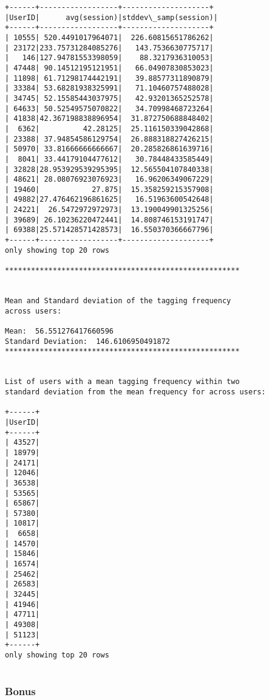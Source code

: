 \documentclass[11pt]{article}
\begin{document}
\begin{Verbatim}[commandchars=\\\{\}]
+------+------------------+--------------------+
|UserID|      avg(session)|stddev\_samp(session)|
+------+------------------+--------------------+
| 10555| 520.4491017964071|  226.60815651786262|
| 23172|233.75731284085276|   143.7536630775717|
|   146|127.94781553398059|    88.3217936310053|
| 47448| 90.14512195121951|   66.04907830853023|
| 11898| 61.71298174442191|   39.88577311890879|
| 33384| 53.68281938325991|   71.10460757488028|
| 34745| 52.15585443037975|   42.93201365252578|
| 64633| 50.52549575070822|   34.70998468723264|
| 41838|42.367198838896954|  31.872750688848402|
|  6362|          42.28125|  25.116150339042868|
| 23388| 37.94854586129754|  26.888318827426215|
| 50970| 33.81666666666667|  20.285826861639716|
|  8041| 33.44179104477612|   30.78448433585449|
| 32828|28.953929539295395|  12.565504107840338|
| 48621| 28.08076923076923|   16.96206349067229|
| 19460|            27.875|  15.358259215357908|
| 49882|27.476462196861625|   16.51963600542648|
| 24221|  26.5472972972973|  13.190049901325256|
| 39689| 26.10236220472441|  14.808746153191747|
| 69388|25.571428571428573|  16.550370366667796|
+------+------------------+--------------------+
only showing top 20 rows

******************************************************


Mean and Standard deviation of the tagging frequency
across users: 

Mean:  56.551276417660596
Standard Deviation:  146.6106950491872
******************************************************


List of users with a mean tagging frequency within two
standard deviation from the mean frequency for across users: 

+------+
|UserID|
+------+
| 43527|
| 18979|
| 24171|
| 12046|
| 36538|
| 53565|
| 65867|
| 57380|
| 10817|
|  6658|
| 14570|
| 15846|
| 16574|
| 25462|
| 26583|
| 32445|
| 41946|
| 47711|
| 49308|
| 51123|
+------+
only showing top 20 rows


    \end{Verbatim}

    \hypertarget{section}{%
\subsubsection{}\label{section}}

    

    \hypertarget{bonus}{%
\subsubsection{Bonus}\label{bonus}}
\end{document}
